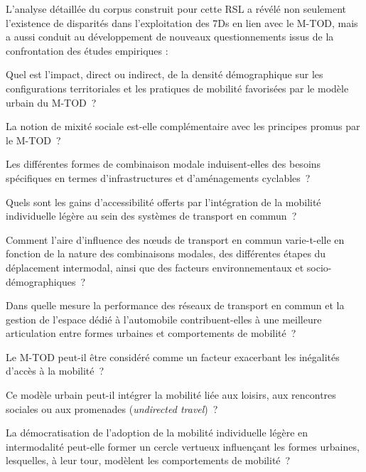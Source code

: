 \begin{refsegment}
L'analyse détaillée du corpus construit pour cette \acrshort{RSL} a révélé non seulement l'existence de disparités dans l'exploitation des \acrshort{7Ds} en lien avec le \acrshort{M-TOD}, mais a aussi conduit au développement de nouveaux questionnements issus de la confrontation des études empiriques :
    \begin{customitemize}
\item Quel est l'impact, direct ou indirect, de la densité démographique sur les configurations territoriales et les pratiques de mobilité favorisées par le modèle urbain du \acrshort{M-TOD}~?
\item La notion de mixité sociale est-elle complémentaire avec les principes promus par le \acrshort{M-TOD}~?
\item Les différentes formes de combinaison modale induisent-elles des besoins spécifiques en termes d'infrastructures et d'aménagements cyclables~?
\item Quels sont les gains d'accessibilité offerts par l'intégration de la mobilité individuelle légère au sein des systèmes de transport en commun~?
\item Comment l'aire d'influence des nœuds de transport en commun varie-t-elle en fonction de la nature des combinaisons modales, des différentes étapes du déplacement intermodal, ainsi que des facteurs environnementaux et socio-démographiques~?
\item Dans quelle mesure la performance des réseaux de transport en commun et la gestion de l'espace dédié à l'automobile contribuent-elles à une meilleure articulation entre formes urbaines et comportements de mobilité~?
\item Le \acrshort{M-TOD} peut-il être considéré comme un facteur exacerbant les inégalités d'accès à la mobilité~?
\item Ce modèle urbain peut-il intégrer la mobilité liée aux loisirs, aux rencontres sociales ou aux promenades (\textsl{undirected travel})~?
\item La démocratisation de l'adoption de la mobilité individuelle légère en intermodalité peut-elle former un cercle vertueux influençant les formes urbaines, lesquelles, à leur tour, modèlent les comportements de mobilité~?
    \end{customitemize}%


\end{refsegment}
